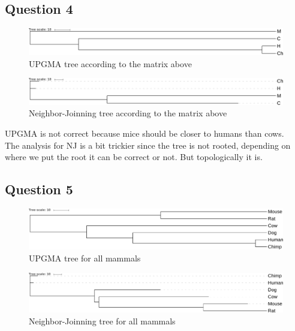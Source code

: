 \documentclass[]{article}
\theoremstyle{definition}
\begin{document}
\newpage 
\subsection{Question 4}


\begin{figure}[h!!]
	\includegraphics*[width = \linewidth]{../UPGMA1.pdf}
	\caption{\label{upgma1} UPGMA tree according to the matrix above }
\end{figure}

\begin{figure}[h!!]
	\includegraphics*[width = \linewidth]{../NJ1.pdf}
	\caption{\label{nj1} Neighbor-Joinning tree according to the matrix above }
\end{figure}

UPGMA is not correct because mice should be closer to humans than cows.\\
The analysis for NJ is a bit trickier since the tree is not rooted, depending on where we put the root it can be correct or not. But topologically it is.\\
\subsection{Question 5}


\begin{figure}[h!]
	\includegraphics*[width = \linewidth]{../files/UPGMA.pdf}
	\caption{\label{upgma2} UPGMA tree for all mammals }
\end{figure}

\begin{figure}[h!]
	\includegraphics*[width = \linewidth]{../files/NJ.pdf}
	\caption{\label{nj2} Neighbor-Joinning tree for all mammals }
\end{figure}
\end{document}

